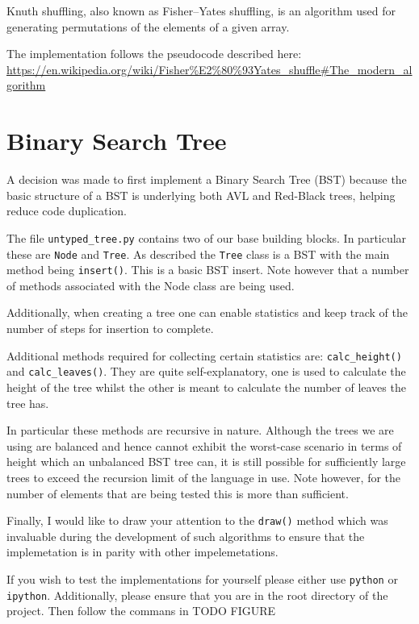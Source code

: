 \documentclass[article]{uom-coursework}
\begin{document}


Knuth shuffling, also known as Fisher--Yates shuffling, is an
algorithm used for generating permutations of the elements of a
given array.

The implementation follows the pseudocode described here:
\url{https://en.wikipedia.org/wiki/Fisher%E2%80%93Yates_shuffle#The_modern_algorithm}

\section{Binary Search Tree}

A decision was made to first implement a Binary Search Tree
(BST) because the basic structure of a BST is underlying both
AVL and Red-Black trees, helping reduce code duplication.

The file \texttt{untyped\_tree.py} contains two of our base
building blocks. In particular these are \texttt{Node} and
\texttt{Tree}. As described the \texttt{Tree} class is a BST
with the main method being \texttt{insert()}. This is a basic
BST insert. Note however that a number of
methods associated with the Node class are being
used.

Additionally, when creating a tree one
can enable statistics and keep track of the
number of steps for insertion to complete.

Additional methods required for collecting certain
statistics are: \texttt{calc\_height()} and
\texttt{calc\_leaves()}. They are
quite self-explanatory, one is used to calculate
the height of the tree whilst
the other is meant to calculate the number of
leaves the tree has.

In particular these methods are recursive in
nature. Although the trees we are
using are balanced and hence cannot
exhibit the worst-case scenario in terms
of height which an unbalanced BST tree can,
it is still possible for sufficiently large
trees to exceed the recursion limit of
the language in use. Note however,
for the number of elements that are being
tested this is more than sufficient.

Finally, I would like to draw your attention
to the \texttt{draw()} method which
was invaluable during the development of
such algorithms to ensure that the implemetation
is in parity with other impelemetations.

If you wish to test the implementations for
yourself please either use \texttt{python}
or \texttt{ipython}. Additionally, please ensure
that you are in the root directory of the project.
Then follow the commans in TODO FIGURE
\end{document}
